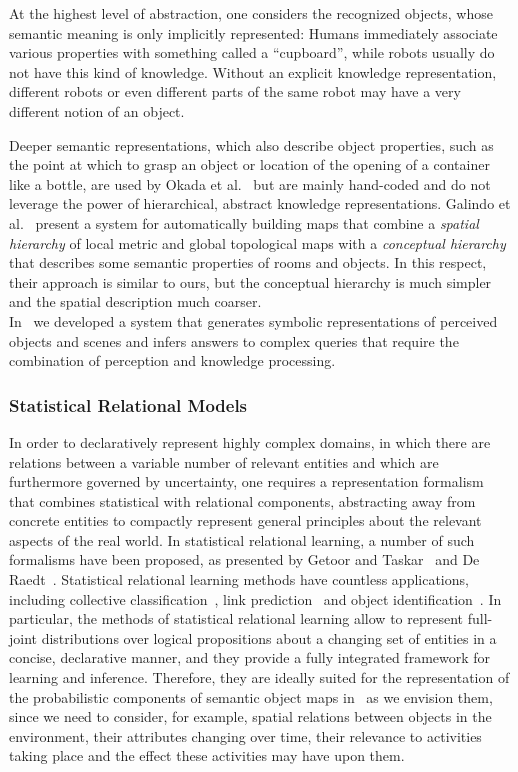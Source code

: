At the highest level of abstraction, one considers
the recognized objects, whose semantic meaning is only implicitly represented: Humans immediately
associate various properties with something called a ``cupboard'', while robots usually do not have
this kind of knowledge. Without an explicit knowledge representation, different robots or even different
parts of the same robot may have a very different notion of an object.

Deeper semantic representations, which also describe object properties, such as the point at which to grasp
an object or location of the opening of a container like a bottle, are used by Okada et al.~\cite{okada2007iros} but are mainly hand-coded
and do not leverage the power of hierarchical, abstract knowledge representations.
Galindo et al.~\cite{galindo08taskplanning} present a system for automatically building maps that
combine a \emph{spatial hierarchy} of local metric and global topological maps with a \emph{conceptual
hierarchy} that describes some semantic properties of rooms and objects. In this respect, their approach is
similar to ours, but the conceptual hierarchy is much simpler and the spatial description much coarser.\\
In~\cite{iros10kcopman} we developed a system that generates symbolic representations
of perceived objects and scenes and infers answers to complex queries that require the combination of perception and knowledge
processing.

\subsubsection{Statistical Relational Models}
\label{sec:markov}

In order to declaratively represent highly complex domains, in which there are relations between a variable
number of relevant entities and which are furthermore governed by uncertainty, one requires a representation
formalism that combines statistical with relational components, abstracting away from concrete entities
to compactly represent general principles about the relevant aspects of the real world.
In statistical relational learning, a number of such formalisms have been proposed,
as presented by Getoor and Taskar~\cite{getoor07introduction} and De Raedt~\cite{DeRaedt08Learning}.
Statistical relational learning methods have countless applications, including collective classification~\cite{neville03collective},
link prediction~\cite{taskar03link} and object identification~\cite{singla06entity}.
In particular, the methods of statistical relational learning allow
to represent full-joint distributions over logical propositions about a changing set of entities in
a concise, declarative manner, and they provide a fully integrated framework for learning and inference. Therefore,
they are ideally suited for the representation of the probabilistic components of semantic object maps in \ksem\ as we envision them,
since we need to consider, for example, spatial relations between objects in the environment, their attributes
changing over time, their relevance to activities taking place and the effect these activities may have upon them.

